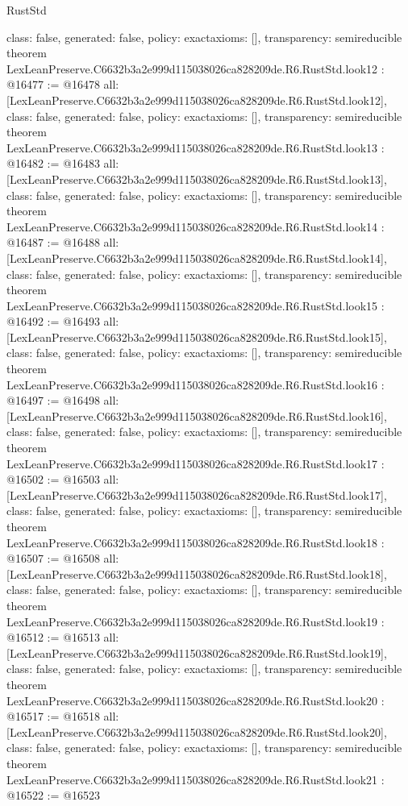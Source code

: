 \begin{lexlean}{RustStd}
\begin{coremodule}
{  class: false,
  generated: false,
  policy: exact{axioms: []},
  transparency: semireducible
}
theorem LexLeanPreserve.C6632b3a2e999d115038026ca828209de.R6.RustStd.look12 : @16477 := @16478 {
  all: [LexLeanPreserve.C6632b3a2e999d115038026ca828209de.R6.RustStd.look12],
  class: false,
  generated: false,
  policy: exact{axioms: []},
  transparency: semireducible
}
theorem LexLeanPreserve.C6632b3a2e999d115038026ca828209de.R6.RustStd.look13 : @16482 := @16483 {
  all: [LexLeanPreserve.C6632b3a2e999d115038026ca828209de.R6.RustStd.look13],
  class: false,
  generated: false,
  policy: exact{axioms: []},
  transparency: semireducible
}
theorem LexLeanPreserve.C6632b3a2e999d115038026ca828209de.R6.RustStd.look14 : @16487 := @16488 {
  all: [LexLeanPreserve.C6632b3a2e999d115038026ca828209de.R6.RustStd.look14],
  class: false,
  generated: false,
  policy: exact{axioms: []},
  transparency: semireducible
}
theorem LexLeanPreserve.C6632b3a2e999d115038026ca828209de.R6.RustStd.look15 : @16492 := @16493 {
  all: [LexLeanPreserve.C6632b3a2e999d115038026ca828209de.R6.RustStd.look15],
  class: false,
  generated: false,
  policy: exact{axioms: []},
  transparency: semireducible
}
theorem LexLeanPreserve.C6632b3a2e999d115038026ca828209de.R6.RustStd.look16 : @16497 := @16498 {
  all: [LexLeanPreserve.C6632b3a2e999d115038026ca828209de.R6.RustStd.look16],
  class: false,
  generated: false,
  policy: exact{axioms: []},
  transparency: semireducible
}
theorem LexLeanPreserve.C6632b3a2e999d115038026ca828209de.R6.RustStd.look17 : @16502 := @16503 {
  all: [LexLeanPreserve.C6632b3a2e999d115038026ca828209de.R6.RustStd.look17],
  class: false,
  generated: false,
  policy: exact{axioms: []},
  transparency: semireducible
}
theorem LexLeanPreserve.C6632b3a2e999d115038026ca828209de.R6.RustStd.look18 : @16507 := @16508 {
  all: [LexLeanPreserve.C6632b3a2e999d115038026ca828209de.R6.RustStd.look18],
  class: false,
  generated: false,
  policy: exact{axioms: []},
  transparency: semireducible
}
theorem LexLeanPreserve.C6632b3a2e999d115038026ca828209de.R6.RustStd.look19 : @16512 := @16513 {
  all: [LexLeanPreserve.C6632b3a2e999d115038026ca828209de.R6.RustStd.look19],
  class: false,
  generated: false,
  policy: exact{axioms: []},
  transparency: semireducible
}
theorem LexLeanPreserve.C6632b3a2e999d115038026ca828209de.R6.RustStd.look20 : @16517 := @16518 {
  all: [LexLeanPreserve.C6632b3a2e999d115038026ca828209de.R6.RustStd.look20],
  class: false,
  generated: false,
  policy: exact{axioms: []},
  transparency: semireducible
}
theorem LexLeanPreserve.C6632b3a2e999d115038026ca828209de.R6.RustStd.look21 : @16522 := @16523 {
}
\end{coremodule}
\end{lexlean}
